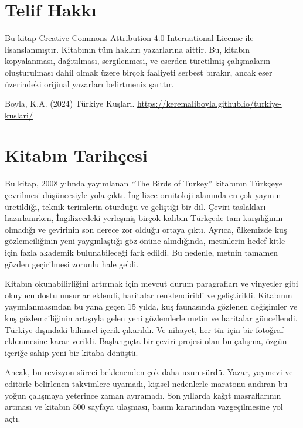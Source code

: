 \documentclass[
  letterpaper,
  DIV=11,
  numbers=noendperiod]{scrreprt}
\begin{document}
\section*{Telif Hakkı}\label{telif-hakkux131}


Bu kitap \href{https://creativecommons.org/licenses/by/4.0/}{Creative
Commons Attribution 4.0 International License} ile lisanslanmıştır.
Kitabının tüm hakları yazarlarına aittir. Bu, kitabın kopyalanması,
dağıtılması, sergilenmesi, ve eserden türetilmiş çalışmaların
oluşturulması dahil olmak üzere birçok faaliyeti serbest bırakır, ancak
eser üzerindeki orijinal yazarları belirtmeniz şarttır.

Boyla, K.A. (2024) Türkiye Kuşları.
\url{https://keremaliboyla.github.io/turkiye-kuslari/}

\section*{Kitabın Tarihçesi}\label{kitabux131n-tarihuxe7esi}


Bu kitap, 2008 yılında yayımlanan ``The Birds of Turkey'' kitabının
Türkçeye çevrilmesi düşüncesiyle yola çıktı. İngilizce ornitoloji
alanında en çok yayının üretildiği, teknik terimlerin oturduğu ve
geliştiği bir dil. Çeviri taslakları hazırlanırken, İngilizcedeki
yerleşmiş birçok kalıbın Türkçede tam karşılığının olmadığı ve çevirinin
son derece zor olduğu ortaya çıktı. Ayrıca, ülkemizde kuş
gözlemciliğinin yeni yaygınlaştığı göz önüne alındığında, metinlerin
hedef kitle için fazla akademik bulunabileceği fark edildi. Bu nedenle,
metnin tamamen gözden geçirilmesi zorunlu hale geldi.

Kitabın okunabilirliğini artırmak için mevcut durum paragrafları ve
vinyetler gibi okuyucu dostu unsurlar eklendi, haritalar renklendirildi
ve geliştirildi. Kitabının yayımlanmasından bu yana geçen 15 yılda, kuş
faunasında gözlenen değişimler ve kuş gözlemciliğinin artışıyla gelen
yeni gözlemlerle metin ve haritalar güncellendi. Türkiye dışındaki
bilimsel içerik çıkarıldı. Ve nihayet, her tür için bir fotoğraf
eklenmesine karar verildi. Başlangıçta bir çeviri projesi olan bu
çalışma, özgün içeriğe sahip yeni bir kitaba dönüştü.

Ancak, bu revizyon süreci beklenenden çok daha uzun sürdü. Yazar,
yayınevi ve editörle belirlenen takvimlere uyamadı, kişisel nedenlerle
maratonu andıran bu yoğun çalışmaya yeterince zaman ayıramadı. Son
yıllarda kağıt masraflarının artması ve kitabın 500 sayfaya ulaşması,
basım kararından vazgeçilmesine yol açtı.
\end{document}
